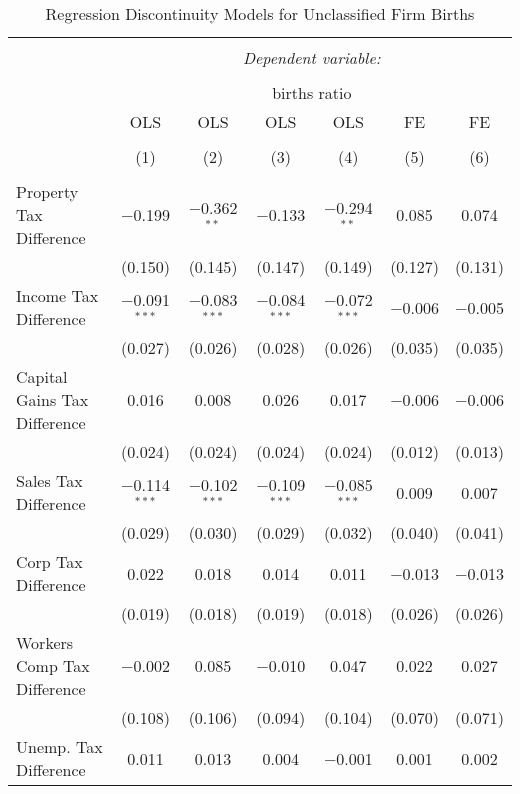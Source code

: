 
\begin{table}[!htbp] \centering 
  \caption{Regression Discontinuity Models for  Unclassified Firm Births} 
  \label{99rd} 
\footnotesize 
\begin{tabular}{@{\extracolsep{5pt}}lcccccc} 
\\[-1.8ex]\hline 
\hline \\[-1.8ex] 
 & \multicolumn{6}{c}{\textit{Dependent variable:}} \\ 
\cline{2-7} 
\\[-1.8ex] & \multicolumn{6}{c}{births ratio} \\ 
 & OLS & OLS & OLS & OLS & FE & FE \\ 
\\[-1.8ex] & (1) & (2) & (3) & (4) & (5) & (6)\\ 
\hline \\[-1.8ex] 
 Property Tax Difference & $-$0.199 & $-$0.362$^{**}$ & $-$0.133 & $-$0.294$^{**}$ & 0.085 & 0.074 \\ 
  & (0.150) & (0.145) & (0.147) & (0.149) & (0.127) & (0.131) \\ 
  Income Tax Difference & $-$0.091$^{***}$ & $-$0.083$^{***}$ & $-$0.084$^{***}$ & $-$0.072$^{***}$ & $-$0.006 & $-$0.005 \\ 
  & (0.027) & (0.026) & (0.028) & (0.026) & (0.035) & (0.035) \\ 
  Capital Gains Tax Difference & 0.016 & 0.008 & 0.026 & 0.017 & $-$0.006 & $-$0.006 \\ 
  & (0.024) & (0.024) & (0.024) & (0.024) & (0.012) & (0.013) \\ 
  Sales Tax Difference & $-$0.114$^{***}$ & $-$0.102$^{***}$ & $-$0.109$^{***}$ & $-$0.085$^{***}$ & 0.009 & 0.007 \\ 
  & (0.029) & (0.030) & (0.029) & (0.032) & (0.040) & (0.041) \\ 
  Corp Tax Difference & 0.022 & 0.018 & 0.014 & 0.011 & $-$0.013 & $-$0.013 \\ 
  & (0.019) & (0.018) & (0.019) & (0.018) & (0.026) & (0.026) \\ 
  Workers Comp Tax Difference & $-$0.002 & 0.085 & $-$0.010 & 0.047 & 0.022 & 0.027 \\ 
  & (0.108) & (0.106) & (0.094) & (0.104) & (0.070) & (0.071) \\ 
  Unemp. Tax Difference & 0.011 & 0.013 & 0.004 & $-$0.001 & 0.001 & 0.002 \\ 

\end{tabular}
\end{table}
